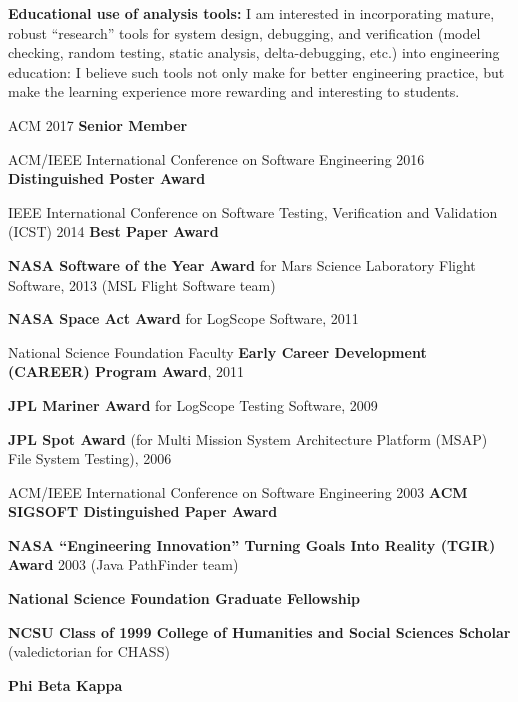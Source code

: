 \documentclass[ComputerScience]{vita}
\newcommand{\comment}[1]{}
\begin{document}
\begin{vita}
\begin{Research Interests}
\begin{Topics}
\item{\bf Educational use of analysis tools:}  I am interested in incorporating mature, robust ``research'' tools for system design, debugging, and verification (model checking, random testing, static analysis, delta-debugging, etc.) into engineering education:  I believe such tools not only make for better engineering practice, but make the learning experience more rewarding and interesting to students.
\comment{
\item {\bf Coverage for model checking:} I am interested in coverage metrics and certification methods for model checkers.  Traditional and cutting-edge measures from the world of testing can be applied to model checking runs, and proof-based techniques for certification have recently appeared.  However, the general problem remains:  after verification, how much confidence should we have in in the correctness of a program?}
\end{Topics}
\end{Research Interests}


\begin{Honors}
\item ACM 2017 {\bf Senior Member}
\item ACM/IEEE International Conference on Software Engineering 2016 {\bf Distinguished Poster Award}
  \item IEEE International Conference on Software Testing, Verification and Validation (ICST) 2014 {\bf Best Paper Award}
  \item {\bf NASA Software of the Year Award} for Mars Science Laboratory Flight Software, 2013 (MSL Flight Software team)
  \item {\bf NASA Space Act Award} for LogScope Software, 2011
  \item National Science Foundation Faculty {\bf Early Career Development (CAREER) Program Award}, 2011
  \item {\bf JPL Mariner Award} for LogScope Testing Software, 2009
  \item {\bf JPL Spot Award} (for Multi Mission System Architecture Platform
  (MSAP) File System Testing), 2006 \item ACM/IEEE International Conference on Software Engineering 2003 {\bf ACM SIGSOFT
  Distinguished Paper Award} \item {\bf NASA ``Engineering Innovation''
  Turning Goals Into Reality (TGIR) Award} 2003 (Java PathFinder team)
  \item {\bf National Science Foundation Graduate Fellowship} \item {\bf NCSU
  Class of 1999 College of Humanities and Social Sciences Scholar}
  (valedictorian for CHASS) \item {\bf Phi Beta Kappa}
\end{Honors}



\end{vita}
\end{document}
